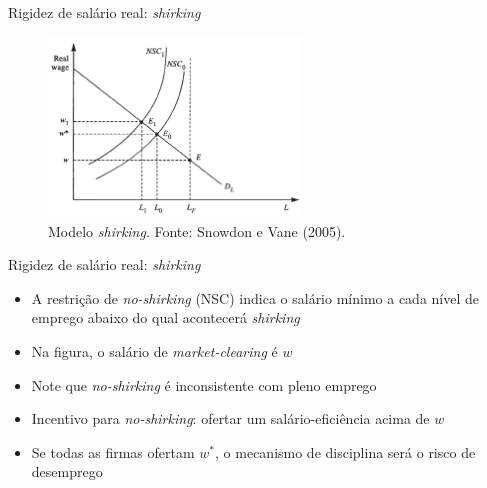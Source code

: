 \documentclass[10pt]{beamer}
\begin{document}
\begin{frame}{Rigidez de salário real: \emph{shirking}}
    \begin{figure}
        \centering
        \includegraphics[width=0.6\textwidth]{./figures/aula15_fig8.PNG}
        \caption{Modelo \emph{shirking}. Fonte: Snowdon e Vane (2005).}
        \label{aula15_fig8}
    \end{figure}
\end{frame}

\begin{frame}{Rigidez de salário real: \emph{shirking}}
    \begin{itemize}
        \item A restrição de \emph{no-shirking} (NSC) indica o salário mínimo a cada nível de emprego abaixo do qual acontecerá \emph{shirking}\bigskip
        \item Na figura, o salário de \emph{market-clearing} é $w$\bigskip
        \item Note que \emph{no-shirking} é inconsistente com pleno emprego\bigskip
        \item Incentivo para \emph{no-shirking}: ofertar um salário-eficiência acima de $w$\bigskip
        \item Se todas as firmas ofertam $w^*$, o mecanismo de disciplina será o risco de desemprego
    \end{itemize}
\end{frame}
\end{document}
